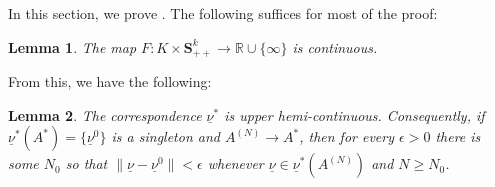 \documentclass{article} %
\newcommand{\R}{\mathbb{R}}
\DeclareMathOperator{\supp}{supp}
\DeclareMathOperator{\range}{range}
\newtheorem{lemma}[lemma]{Lemma}
\newcommand{\ul}[1]{\underline{#1}}
\begin{document}

In this section, we prove . The following suffices for most of the proof:
\begin{lemma}\label{lemma:Fcont}
    The map $F:K\times \mathbf{S}^k_{++}\longrightarrow\R\cup\{\infty\}$ is continuous.
\end{lemma}
From this, we have the following:
\begin{lemma}\label{lemma:nucont}
    The correspondence $\ul{\nu}^*$ is upper hemi-continuous. Consequently, if $\ul{\nu}^*(A^*)=\{\ul{\nu}^0\}$ is a singleton and $A^{(N)}\to A^*$, then for every $\epsilon>0$ there is some $N_0$ so that $\|\ul{\nu}-\ul{\nu}^0\|<\epsilon$ whenever $\ul{\nu}\in\ul{\nu}^*(A^{(N)})$ and $N\geq N_0$.
\end{lemma}
\end{document}
